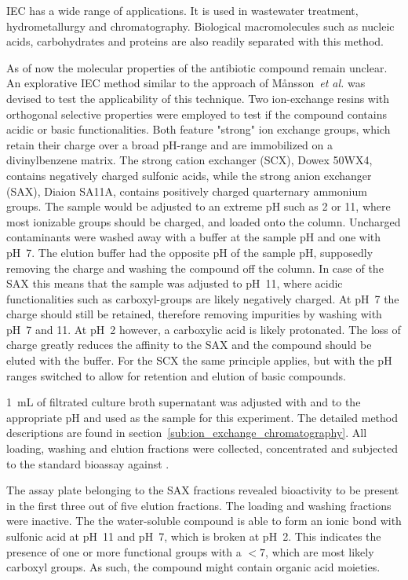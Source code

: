 IEC has a wide range of applications. It is used in wastewater treatment, hydrometallurgy and chromatography.\autocite{Alexandratos2009}
Biological macromolecules such as nucleic acids, carbohydrates and proteins are also readily separated with this method.\autocite{Dragull2012,Lee1996,Kenney1992}


As of now the molecular properties of the antibiotic compound remain
unclear. An explorative IEC method similar to the approach of
M{\aa}nsson~\textit{et al.} was devised to test the applicability of this technique.\autocite{Mansson2010}
Two ion-exchange resins with orthogonal selective properties were employed to test if the compound contains acidic or basic functionalities.
Both feature "strong" ion exchange groups, which retain their charge over a broad pH-range and are immobilized on a divinylbenzene matrix.
The strong cation exchanger (SCX), Dowex 50WX4, contains negatively charged sulfonic acids, while the strong anion exchanger (SAX), Diaion SA11A, contains positively charged quarternary ammonium groups.
The sample would be adjusted to an extreme pH such as 2 or 11, where most ionizable groups should be charged, and loaded onto the column.
Uncharged contaminants were washed away with a buffer at the sample pH and one with pH~7.
The elution buffer had the opposite pH of the sample pH, supposedly removing the charge and washing the compound off the column.
In case of the SAX this means that the sample was adjusted to pH~11, where acidic functionalities such as carboxyl-groups are likely negatively charged.
At pH~7 the charge should still be retained, therefore removing impurities by washing with pH~7 and 11.
At pH~2 however, a carboxylic acid is likely protonated.
The loss of charge greatly reduces the affinity to the SAX and the compound should be eluted with the buffer.
For the SCX the same principle applies, but with the pH ranges switched to allow for retention and elution of basic compounds.

\SI{1}{\milli\liter} of filtrated culture broth supernatant was adjusted with  and  to the appropriate pH and used as the sample for this experiment.
The detailed method descriptions are found in section~\ref{sub:ion_exchange_chromatography}.
All loading, washing and elution fractions were collected, concentrated and subjected to the standard bioassay against \coli.

The assay plate belonging to the SAX fractions revealed bioactivity to be present in the first three out of five elution fractions.
The loading and washing fractions were inactive.
The the water-soluble compound is able to form an ionic bond with sulfonic acid at pH~11 and pH~7, which is broken at pH~2.
This indicates the presence of one or more functional groups with a \pka$<7$, which are most likely carboxyl groups.
As such, the compound might contain organic acid moieties.

